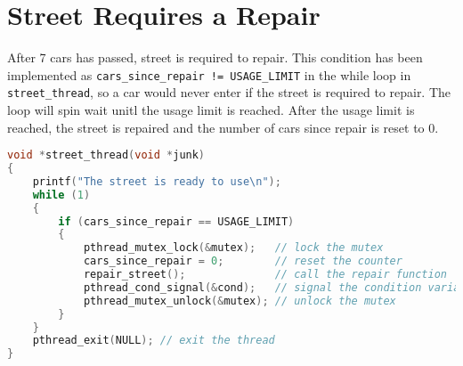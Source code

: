 \documentclass{article}
\theoremstyle{mytheoremstyle}
\theoremstyle{mytheoremstyle}
\theoremstyle{myproblemstyle}
\begin{document}
\section{Street Requires a Repair}
After 7 cars has passed, street is required to repair. This condition has been implemented as {\tt cars\_since\_repair != USAGE\_LIMIT} in the while loop in {\tt street\_thread}, so a car would never enter if the street is required to repair. The loop will spin wait unitl the usage limit is reached. After the usage limit is reached, the street is repaired and the number of cars since repair is reset to 0.
\begin{lstlisting}[language=C, caption={\tt street\_thread}]
void *street_thread(void *junk)
{
    printf("The street is ready to use\n");
    while (1)
    {
        if (cars_since_repair == USAGE_LIMIT)
        {
            pthread_mutex_lock(&mutex);	  // lock the mutex
            cars_since_repair = 0;		  // reset the counter
            repair_street();			  // call the repair function
            pthread_cond_signal(&cond);	  // signal the condition variable
            pthread_mutex_unlock(&mutex); // unlock the mutex
        }
    }
    pthread_exit(NULL); // exit the thread
}
    \end{lstlisting}
\end{document}
